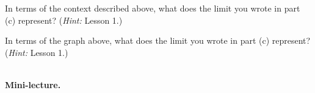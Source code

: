 \documentclass[10pt]{article}
\begin{document}
{    \item In terms of the context described above, what does the limit you wrote in part (c) represent? ({\it Hint:} Lesson 1.)\\

    
    \item In terms of the graph above, what does the limit you wrote in part (c) represent?  ({\it Hint:} Lesson 1.)\\

}

\newpage%

\,\\[-0.5in]

{\bf\color{blue} Mini-lecture.} \\
\end{document}
